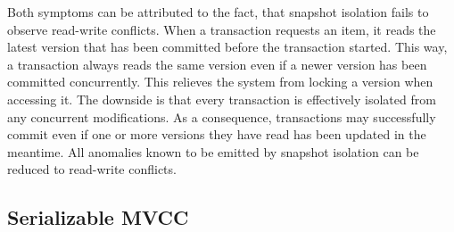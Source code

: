 Both symptoms can be attributed to the fact, that snapshot isolation fails to
observe read-write conflicts. When a transaction requests an item, it reads the
latest version that has been committed before the transaction started. This way,
a transaction always reads the same version even if a newer version has been
committed concurrently. This relieves the system from locking a version when
accessing it. The downside is that every transaction is effectively isolated
from any concurrent modifications. As a consequence, transactions may
successfully commit even if one or more versions they have read has been updated
in the meantime. All anomalies known to be emitted by snapshot isolation can be
reduced to read-write conflicts.

\subsection{Serializable MVCC}


